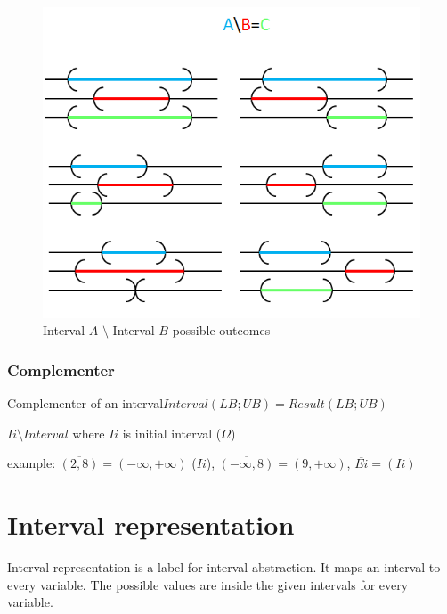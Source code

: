 \begin{figure} [!ht]
	\centering
	\includegraphics[width=150mm, keepaspectratio]{figures/aminusb.png}
	\caption{\label{fig:aminusb} Interval $A$ $\setminus$ Interval $B$ possible outcomes}
\end{figure}

\subsubsection{Complementer}

Complementer of an interval$ \overline{Interval(LB;UB)}=Result(LB;UB)$
	
$Ii \setminus Interval$ where $Ii$ is initial interval ($\Omega$)
	
example: $\overline{(2,8)}=(-\infty,+\infty)$ ($Ii$), $\overline{(-\infty,8)}=(9,+\infty)$, $\overline{Ei}=(Ii)$

\section{Interval representation}
\begin{definition}
Interval representation is a label for interval abstraction. It maps an interval to every variable. The possible values are inside the given intervals for every variable.
\end{definition}

